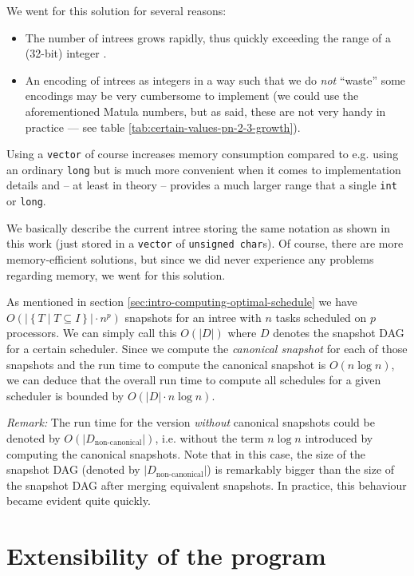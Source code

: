 We went for this solution for several reasons:

\begin{itemize}
\item The number of intrees grows rapidly, thus quickly exceeding the range of a (32-bit) integer \cite{oeisrootedtrees}.
\item An encoding of intrees as integers in a way such that we do \emph{not} ``waste'' some encodings may be very cumbersome to implement (we could use the aforementioned Matula numbers, but as said, these are not very handy in practice --- see table \ref{tab:certain-values-pn-2-3-growth}).
\end{itemize}

Using a \texttt{vector} of course increases memory consumption compared to e.g. using an ordinary \texttt{long} but is much more convenient when it comes to implementation details and -- at least in theory -- provides a much larger range that a single \texttt{int} or \texttt{long}.

We basically describe the current intree storing the same notation as shown in this work (just stored in a \texttt{vector} of \texttt{unsigned char}s). Of course, there are more memory-efficient solutions, but since we did never experience any problems regarding memory, we went for this solution.

As mentioned in section \ref{sec:intro-computing-optimal-schedule} we have $O\left(|\left\{ T \mid T\subseteq I \right\}|\cdot n^p\right)$ snapshots for an intree with $n$ tasks scheduled on $p$ processors. We can simply call this $O\left(|D|\right)$ where $D$ denotes the snapshot DAG for a certain scheduler. Since we compute the \emph{canonical snapshot} for each of those snapshots and the run time to compute the canonical snapshot is $O(n \log n)$, we can deduce that the overall run time to compute all schedules for a given scheduler is bounded by $O(|D| \cdot n \log n)$.

\emph{Remark:} The run time for the version \emph{without} canonical snapshots could be denoted by $O(|D_{\text{non-canonical}}|)$, i.e. without the term $n\log n$ introduced by computing the canonical snapshots. Note that in this case, the size of the snapshot DAG (denoted by $|D_{\text{non-canonical}}|$) is remarkably bigger than the size of the snapshot DAG after merging equivalent snapshots. In practice, this behaviour became evident quite quickly.

\section{Extensibility of the program}
\label{sec:implementation-extending-program}

